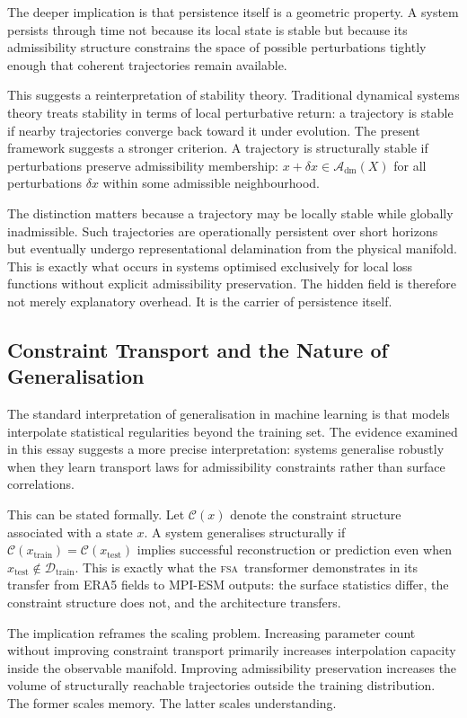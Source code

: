 \documentclass[11pt,a4paper]{article}
\theoremstyle{plain}
\theoremstyle{definition}
\theoremstyle{remark}
\newcommand{\Adm}{\mathcal{A}_{\mathrm{dm}}}
\newcommand{\FSA}{\textup{\textsc{fsa}}}
\begin{document}
The deeper implication is that persistence itself is a geometric property.
A system persists through time not because its local state is stable but
because its admissibility structure constrains the space of possible
perturbations tightly enough that coherent trajectories remain available.

This suggests a reinterpretation of stability theory. Traditional dynamical
systems theory treats stability in terms of local perturbative return: a
trajectory is stable if nearby trajectories converge back toward it under
evolution. The present framework suggests a stronger criterion. A trajectory
is structurally stable if perturbations preserve admissibility membership:
$x + \delta x \in \Adm(X)$ for all perturbations $\delta x$ within some
admissible neighbourhood.

The distinction matters because a trajectory may be locally stable while
globally inadmissible. Such trajectories are operationally persistent over
short horizons but eventually undergo representational delamination from
the physical manifold. This is exactly what occurs in systems optimised
exclusively for local loss functions without explicit admissibility
preservation. The hidden field is therefore not merely explanatory overhead.
It is the carrier of persistence itself.

\subsection{Constraint Transport and the Nature of Generalisation}

The standard interpretation of generalisation in machine learning is that
models interpolate statistical regularities beyond the training set. The
evidence examined in this essay suggests a more precise interpretation:
systems generalise robustly when they learn transport laws for admissibility
constraints rather than surface correlations.

This can be stated formally. Let $\mathcal{C}(x)$ denote the constraint
structure associated with a state $x$. A system generalises structurally if
$\mathcal{C}(x_{\mathrm{train}}) = \mathcal{C}(x_{\mathrm{test}})$ implies
successful reconstruction or prediction even when $x_{\mathrm{test}} \notin
\mathcal{D}_{\mathrm{train}}$. This is exactly what the \FSA\ transformer
demonstrates in its transfer from ERA5 fields to MPI-ESM outputs: the
surface statistics differ, the constraint structure does not, and the
architecture transfers.

The implication reframes the scaling problem. Increasing parameter count
without improving constraint transport primarily increases interpolation
capacity inside the observable manifold. Improving admissibility preservation
increases the volume of structurally reachable trajectories outside the
training distribution. The former scales memory. The latter scales
understanding.
\end{document}
